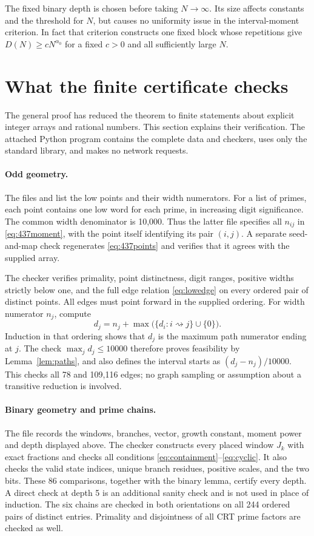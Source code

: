 \documentclass[11pt]{article}
\theoremstyle{definition}
\theoremstyle{remark}
\newcommand{\al}{\alpha_0}
\begin{document}
The fixed binary depth is chosen before taking $N\to\infty$. Its size
affects constants and the threshold for $N$, but causes no uniformity
issue in the interval-moment criterion. In fact that criterion constructs
one fixed block whose repetitions give $D(N)\ge cN^{\al}$ for a fixed
$c>0$ and all sufficiently large $N$.

\section{What the finite certificate checks}\label{sec:verification}
The general proof has reduced the theorem to finite statements about
explicit integer arrays and rational numbers. This section explains their
verification. The attached Python program contains the complete data and
checkers, uses only the standard library, and makes no network requests.

\paragraph{Odd geometry.}
The files  and 
list the low points and their width numerators. For a list of primes,
each point contains one low word for each prime, in increasing digit
significance. The common width denominator is 10,000. Thus the latter
file specifies all $n_{ij}$ in \eqref{eq:437moment}, with the point itself
identifying its pair $(i,j)$. A separate seed-and-map check regenerates
\eqref{eq:437points} and verifies that it agrees with the supplied array.

The checker verifies primality, point distinctness, digit ranges, positive
widths strictly below one, and the full edge relation \eqref{eq:lowedge}
on every ordered pair of distinct points. All edges must point forward
in the supplied ordering. For width numerator $n_j$, compute
\[
 d_j=n_j+\max\bigl(\{d_i:i\rightsquigarrow j\}\cup\{0\}\bigr).
\]
Induction in that ordering shows that $d_j$ is the maximum path numerator
ending at $j$. The check $\max_jd_j\le10000$ therefore proves feasibility
by Lemma~\ref{lem:paths}, and also defines the interval starts as
$(d_j-n_j)/10000$. This checks all 78 and 109,116 edges; no graph sampling
or assumption about a transitive reduction is involved.

\paragraph{Binary geometry and prime chains.}
The file  records the windows,
branches, vector, growth constant, moment power and depth displayed above.
The checker constructs every placed window $J_k$ with exact fractions and
checks all conditions \eqref{eq:containment}--\eqref{eq:cyclic}. It also
checks the valid state indices, unique branch residues, positive scales,
and the two bits. These 86 comparisons, together with the binary lemma,
certify every depth. A direct check at depth 5 is an additional sanity
check and is not used in place of induction. The six chains are checked
in both orientations on all 244 ordered pairs of distinct entries.
Primality and disjointness of all CRT prime factors are checked as well.
\end{document}
